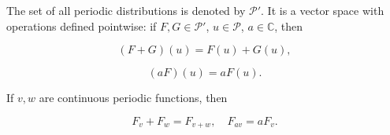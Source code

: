 The set of all periodic distributions is denoted by $\mathcal{P}'$. It is a vector space with operations defined pointwise: if $F, G \in \mathcal{P}'$, $u \in \mathcal{P}$, $a \in \mathbb{C}$, then

$$(F + G)(u) = F(u) + G(u),$$

$$(aF)(u) = aF(u).$$

If $v, w$ are continuous periodic functions, then

$$F_v + F_w = F_{v+w}, \quad F_{av} = aF_v.$$
